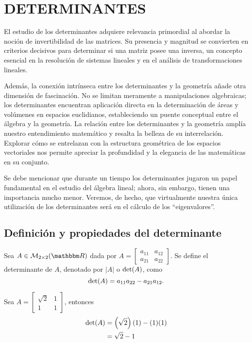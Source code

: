 \chapter{DETERMINANTES}
\printchaptertableofcontents

El estudio de los determinantes adquiere relevancia primordial al abordar la noción de invertibilidad de las matrices. Su presencia y magnitud se convierten en criterios decisivos para determinar si una matriz posee una inversa, un concepto esencial en la resolución de sistemas lineales y en el análisis de transformaciones lineales.

Además, la conexión intrínseca entre los determinantes y la geometría añade otra dimensión de fascinación. No se limitan meramente a manipulaciones algebraicas; los determinantes encuentran aplicación directa en la determinación de áreas y volúmenes en espacios euclidianos, estableciendo un puente conceptual entre el álgebra y la geometría. La relación entre los determinantes y la geometría amplía nuestro entendimiento matemático y resalta la belleza de su interrelación. Explorar cómo se entrelazan con la estructura geométrica de los espacios vectoriales nos permite apreciar la profundidad y la elegancia de las matemáticas en su conjunto.

Se debe mencionar que durante un tiempo los determinantes jugaron un papel fundamental en el estudio del álgebra lineal; ahora, sin embargo, tienen una importancia mucho menor. Veremos, de hecho, que virtualmente nuestra única utilización de los determinantes será en el cálculo de los “eigenvalores”.

\section{Definición y propiedades del determinante}

\begin{definition}
    Sea $A \in \mathcal{M}_{2 \times 2}(\RR)$ dada por $A = \begin{bmatrix}
        a_{11} & a_{12} \\
        a_{21} & a_{22}
    \end{bmatrix}$. Se define el determinante de $A$, denotado por $|A|$ o $\operatorname{det}(A)$, como
    $$\operatorname{det}(A) = a_{11}a_{22} - a_{21}a_{12}.$$
\end{definition}

\newpage

\begin{example}
    Sea $A = \begin{bmatrix}
        \sqrt{2} & 1 \\
        1 & 1
    \end{bmatrix}$, entonces
    \begin{align*}
        \operatorname{det}(A) & = \left( \sqrt{2} \right) (1) - (1)(1) \\
        & = \sqrt{2} - 1
    \end{align*}
\end{example}

